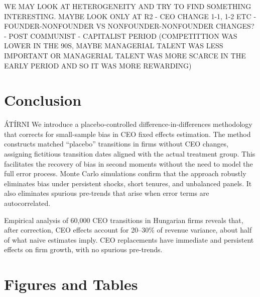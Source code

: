\documentclass[11pt,a4paper]{article}
\begin{document}
WE MAY LOOK AT HETEROGENEITY AND TRY TO FIND SOMETHING INTERESTING. MAYBE LOOK ONLY AT R2
- CEO CHANGE 1-1, 1-2 ETC 
- FOUNDER-NONFOUNDER VS NONFOUNDER-NONFOUNDER CHANGES?
- POST COMMUNIST - CAPITALIST PERIOD (COMPETITTION WAS LOWER IN THE 90S, MAYBE MANAGERIAL TALENT WAS LESS IMPORTANT OR MANAGERIAL TALENT WAS MORE SCARCE IN THE EARLY PERIOD AND SO IT WAS MORE REWARDING)


\section{Conclusion}\label{sec:concl}

ÁTÍRNI We introduce a placebo-controlled difference-in-differences methodology that corrects for small-sample bias in CEO fixed effects estimation. The method constructs matched “placebo” transitions in firms without CEO changes, assigning fictitious transition dates aligned with the actual treatment group. This facilitates the recovery of bias in second moments without the need to model the full error process. Monte Carlo simulations confirm that the approach robustly eliminates bias under persistent shocks, short tenures, and unbalanced panels. It also eliminates spurious pre-trends that arise when error terms are autocorrelated.

Empirical analysis of 60,000 CEO transitions in Hungarian firms reveals that, after correction, CEO effects account for 20–30\% of revenue variance, about half of what naive estimates imply. CEO replacements have immediate and persistent effects on firm growth, with no spurious pre-trends. 
\clearpage 


%

\clearpage

\section*{Figures and Tables}
\end{document}
